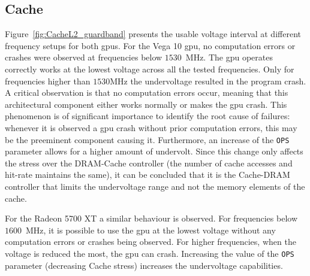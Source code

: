 \subsection{Cache}
\label{sec:cache_guardband}

Figure~\ref{fig:CacheL2_guardband} presents the usable voltage interval at different frequency setups for both \acrshort{gpu}s. 
For the Vega 10 \acrshort{gpu}, no computation errors or crashes were observed at frequencies below $1530$~MHz. The \acrshort{gpu} operates correctly works at the lowest voltage across all the tested frequencies. 
Only for frequencies higher than $1530$MHz the  undervoltage resulted in the program crash. A critical observation is that no computation errors occur, meaning that this architectural component either works normally or makes the \acrshort{gpu} crash. This phenomenon is of significant importance to identify the root cause of failures: whenever it is observed a \acrshort{gpu} crash without prior computation errors, this may be the preeminent component causing it.
Furthermore, an increase of the \texttt{OPS} parameter allows for a higher amount of undervolt. Since this change only affects the stress over the DRAM-Cache controller (the number of cache accesses and hit-rate maintains the same), it can be concluded that it is the Cache-DRAM controller that limits the undervoltage range and not the memory elements of the cache. 

For the Radeon 5700 XT a similar behaviour is observed. For frequencies below $1600$~MHz, it is possible to use the \acrshort{gpu} at the lowest voltage without any computation errors or crashes being observed. For higher frequencies, when the voltage is reduced the most, the \acrshort{gpu} can crash. Increasing the value of the \texttt{OPS} parameter (decreasing Cache stress) increases the undervoltage capabilities. 



